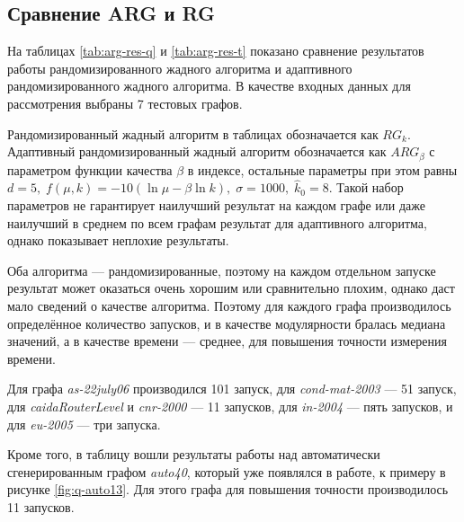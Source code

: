 
\subsection{Сравнение ARG и RG}
\label{subsec:arg-res}

На таблицах \ref{tab:arg-res-q} и \ref{tab:arg-res-t} показано сравнение результатов работы рандомизированного жадного алгоритма и адаптивного рандомизированного жадного алгоритма. В качестве входных данных для рассмотрения выбраны 7 тестовых графов.

Рандомизированный жадный алгоритм в таблицах обозначается как $RG_k$. Адаптивный рандомизированный жадный алгоритм обозначается как $ARG_{\beta}$ с параметром функции качества $\beta$ в индексе, остальные параметры при этом равны $d = 5,\;f(\mu, k) = -10 (\ln \mu - \beta \ln k),\;\sigma = 1000,\;\hat{k}_0 = 8$. Такой набор параметров не гарантирует наилучший результат на каждом графе или даже наилучший в среднем по всем графам результат для адаптивного алгоритма, однако показывает неплохие результаты.

Оба алгоритма --- рандомизированные, поэтому на каждом отдельном запуске результат может оказаться очень хорошим или сравнительно плохим, однако даст мало сведений о качестве алгоритма. Поэтому для каждого графа производилось определённое количество запусков, и в качестве модулярности бралась медиана значений, а в качестве времени --- среднее, для повышения точности измерения времени.

Для графа \emph{as-22july06} производился 101 запуск, для \emph{cond-mat-2003} --- 51 запуск, для \emph{caidaRouterLevel} и \emph{cnr-2000} --- 11 запусков, для \emph{in-2004} --- пять запусков, и для \emph{eu-2005} --- три запуска.

Кроме того, в таблицу вошли результаты работы над автоматически сгенерированным графом \emph{auto40}, который уже появлялся в работе, к примеру в рисунке \ref{fig:q-auto13}. Для этого графа для повышения точности производилось 11 запусков.


